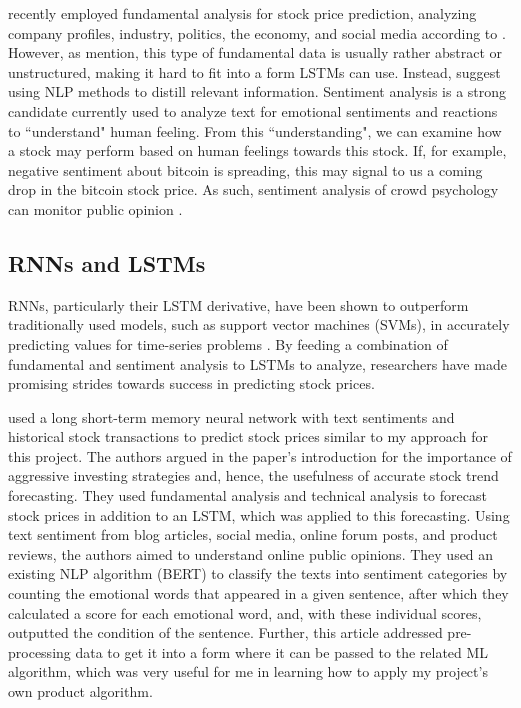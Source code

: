 \documentclass[10pt,twocolumn]{article}
\begin{document}
\textcite{ReviewAndTaxonomyOfPredictionTechniques} recently employed fundamental analysis for stock price prediction, analyzing company profiles, industry, politics, the economy, and social media according to \textcite{LSTMSentimentAnalysis}. However, as \textcite{LSTMSentimentAnalysis} mention, this type of fundamental data is usually rather abstract or unstructured, making it hard to fit into a form LSTMs can use. Instead, \textcite{LSTMSentimentAnalysis} suggest using NLP methods to distill relevant information. Sentiment analysis is a strong candidate currently used to analyze text for emotional sentiments and reactions to ``understand" human feeling. From this ``understanding", we can examine how a stock may perform based on human feelings towards this stock. If, for example, negative sentiment about bitcoin is spreading, this may signal to us a coming drop in the bitcoin stock price. As such, sentiment analysis of crowd psychology can monitor public opinion \cite{LSTMSentimentAnalysis}.

\subsection{RNNs and LSTMs} \label{RNN-LSTMs}

RNNs, particularly their LSTM derivative, have been shown to outperform traditionally used models, such as support vector machines (SVMs), in accurately predicting values for time-series problems \cite{LSTMSentimentAnalysis}. By feeding a combination of fundamental and sentiment analysis to LSTMs to analyze, researchers have made promising strides towards success in predicting stock prices.

\textcite{LSTMSentimentAnalysis} used a long short-term memory neural network with text sentiments and historical stock transactions to predict stock prices similar to my approach for this project. The authors argued in the paper's introduction for the importance of aggressive investing strategies and, hence, the usefulness of accurate stock trend forecasting. They used fundamental analysis and technical analysis to forecast stock prices in addition to an LSTM, which was applied to this forecasting. Using text sentiment from blog articles, social media, online forum posts, and product reviews, the authors aimed to understand online public opinions. They used an existing NLP algorithm (BERT) to classify the texts into sentiment categories by counting the emotional words that appeared in a given sentence, after which they calculated a score for each emotional word, and, with these individual scores, outputted the condition of the sentence. Further, this article addressed pre-processing data to get it into a form where it can be passed to the related ML algorithm, which was very useful for me in learning how to apply my project's own product algorithm.
\end{document}
